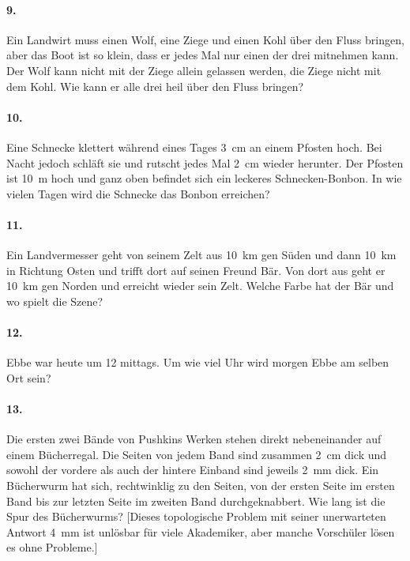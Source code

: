 \documentclass[10pt,a5paper,twoside]{article}
\newenvironment{problem}[1]{\paragraph*{#1}}{}
\begin{document}
\begin{problem}{9.}
	Ein Landwirt muss einen Wolf, eine Ziege und einen Kohl über den Fluss bringen, aber das Boot ist so klein, dass er jedes Mal nur einen der drei mitnehmen kann. Der Wolf kann nicht mit der Ziege allein gelassen werden, die Ziege nicht mit dem Kohl. Wie kann er alle drei heil über den Fluss bringen? 
\end{problem}

\begin{problem}{10.}
	Eine Schnecke klettert während eines Tages \SI{3}{\cm} an einem Pfosten hoch. Bei Nacht jedoch schläft sie und rutscht jedes Mal \SI{2}{\cm} wieder herunter. Der Pfosten ist \SI{10}{\metre} hoch und ganz oben befindet sich ein leckeres Schnecken-Bonbon. In wie vielen Tagen wird die Schnecke das Bonbon erreichen?
\end{problem}

\begin{problem}{11.}
	Ein Landvermesser geht von seinem Zelt aus \SI{10}{\km} gen Süden und dann \SI{10}{\km} in Richtung Osten und trifft dort auf seinen Freund Bär. Von dort aus geht er \SI{10}{\km} gen Norden und erreicht wieder sein Zelt. Welche Farbe hat der Bär und wo spielt die Szene?
\end{problem}

\begin{problem}{12.}
	Ebbe war heute um \SI{12}{\uhr} mittags. Um wie viel Uhr wird morgen Ebbe am selben Ort sein?
\end{problem}

\begin{problem}{13.}
	Die ersten zwei Bände von Pushkins Werken stehen direkt nebeneinander auf einem Bücherregal. Die Seiten von jedem Band sind zusammen \SI{2}{\cm} dick und sowohl der vordere als auch der hintere Einband sind jeweils \SI{2}{\mm} dick. Ein Bücherwurm hat sich, rechtwinklig zu den Seiten, von der ersten Seite im ersten Band bis zur letzten Seite im zweiten Band durchgeknabbert. Wie lang ist die Spur des Bücherwurms? [Dieses topologische Problem mit seiner unerwarteten Antwort \SI{4}{\mm} ist unlösbar für viele Akademiker, aber manche Vorschüler lösen es ohne Probleme.]
\end{problem}
\end{document}
